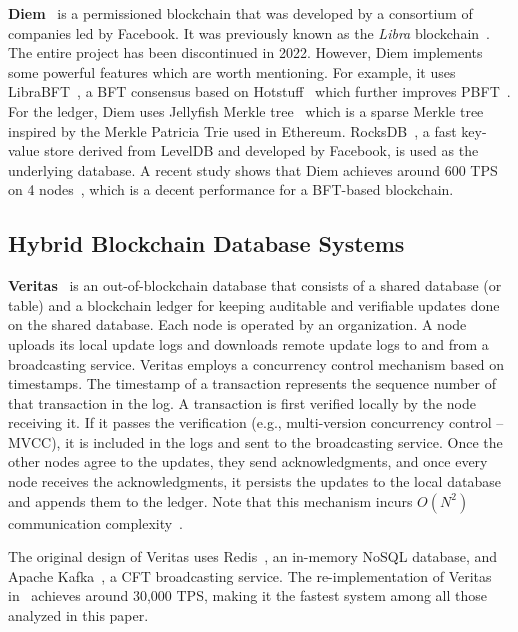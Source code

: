 \documentclass[11pt]{article}
\begin{document}
\textbf{Diem}~\cite{diem_page} is a permissioned blockchain that was developed by a consortium of companies led by Facebook. It was previously known as the \textit{Libra} blockchain~\cite{diem_page}. The entire project has been discontinued in 2022. However, Diem implements some powerful features which are worth mentioning. For example, it uses LibraBFT~\cite{Baudet2019StateMR}, a BFT consensus based on Hotstuff~\cite{hotstuff} which further improves PBFT~\cite{pbft}. For the ledger, Diem uses Jellyfish Merkle tree~\cite{jmt_diem} which is a sparse Merkle tree inspired by the Merkle Patricia Trie used in Ethereum. RocksDB~\cite{rocksdb_paper}, a fast key-value store derived from LevelDB and developed by Facebook, is used as the underlying database. A recent study shows that Diem achieves around 600 TPS on 4 nodes~\cite{perf_diem}, which is a decent performance for a BFT-based blockchain.


\subsection{Hybrid Blockchain Database Systems}

\textbf{Veritas}~\cite{veritas_cidr19} is an out-of-blockchain database that consists of a shared database (or table) and a blockchain ledger for keeping auditable and verifiable updates done on the shared database. Each node is operated by an organization. A node uploads its local update logs and downloads remote update logs to and from a broadcasting service. Veritas employs a concurrency control mechanism based on timestamps. The timestamp of a transaction represents the sequence number of that transaction in the log. A transaction is first verified locally by the node receiving it. If it passes the verification (e.g., multi-version concurrency control -- MVCC), it is included in the logs and sent to the broadcasting service. Once the other nodes agree to the updates, they send acknowledgments, and once every node receives the acknowledgments, it persists the updates to the local database and appends them to the ledger. Note that this mechanism incurs $O(N^2)$ communication complexity~\cite{loghin_vldb2022}.

The original design of Veritas uses Redis~\cite{redis_book}, an in-memory NoSQL database, and Apache Kafka~\cite{kafka_site}, a CFT broadcasting service. The re-implementation of Veritas in~\cite{loghin_vldb2022} achieves around 30,000 TPS, making it the fastest system among all those analyzed in this paper.
\end{document}
